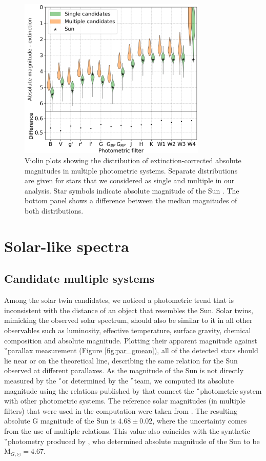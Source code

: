 \begin{figure}
	\centering
	\includegraphics[width=0.8\textwidth]{multimagplotebvc307.png}
	\caption{Violin plots showing the distribution of extinction-corrected absolute magnitudes in multiple photometric systems. Separate distributions are given for stars that we considered as single and multiple in our analysis. Star symbols indicate absolute magnitude of the Sun \cite{2018ApJS..236...47W}. The bottom panel shows a difference between the median magnitudes of both distributions.}
	\label{fig:viol_photometry}
\end{figure}

\section{Solar-like spectra}

\subsection{Candidate multiple systems}
\label{sec:multi_cand}
Among the solar twin candidates, we noticed a photometric trend that is inconsistent with the distance of an object that resembles the Sun. Solar twins, mimicking the observed solar spectrum, should also be similar to it in all other observables such as luminosity, effective temperature, surface gravity, chemical composition and absolute magnitude. Plotting their apparent magnitude against \G\ parallax measurement (Figure \ref{fig:par_gmean}), all of the detected stars should lie near or on the theoretical line, describing the same relation for the Sun observed at different parallaxes. As the magnitude of the Sun is not directly measured by the \G\ or determined by the \G\ team, we computed its absolute magnitude using the relations published by \citet{2018arXiv180409368E} that connect the \G\ photometric system with other photometric systems. The reference solar magnitudes (in multiple filters) that were used in the computation were taken from \citet{2018ApJS..236...47W}. The resulting absolute G magnitude of the Sun is $4.68 \pm 0.02$, where the uncertainty comes from the use of multiple relations. This value also coincides with the synthetic \G\ photometry produced by \citet{2018MNRAS.479L.102C}, who determined absolute magnitude of the Sun to be M$_{G, \odot} = 4.67$.

